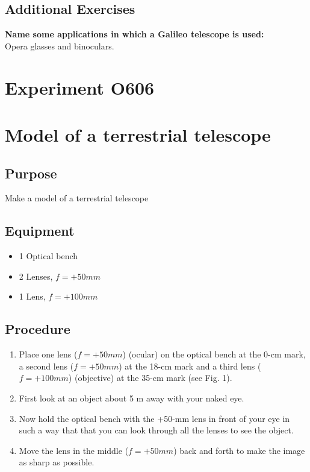 \documentclass[12pt]{article}
\begin{document}
\subsection*{Additional Exercises}
\textbf{Name some applications in which a Galileo telescope is used:}\\
Opera glasses and binoculars. 

\newpage
\section*{Experiment O606}

\section*{Model of a terrestrial telescope}

\subsection*{Purpose}
Make a model of a terrestrial telescope

\subsection*{Equipment}
\begin{itemize}
    \item 1 Optical bench
    \item 2 Lenses, $f=+50 mm$
    \item 1 Lens, $f=+100 mm$
\end{itemize}

\subsection*{Procedure}
\begin{enumerate}
    \item Place one lens ($f = +50 mm$) (ocular) on the optical bench at the 0-cm mark, a second lens ($f = + 50 mm$) at the 18-cm mark and a third lens ($f = + 100 mm$) (objective) at the 35-cm mark (see Fig. 1). 
    \item First look at an object about 5 m away with your naked eye. 
    \item Now hold the optical bench with the +50-mm lens in front of your eye in such a way that that you can look through all the lenses to see the object. 
    \item Move the lens in the middle ($f = + 50 mm$) back and forth to make the image as sharp as possible. 
\end{enumerate}
\end{document}
